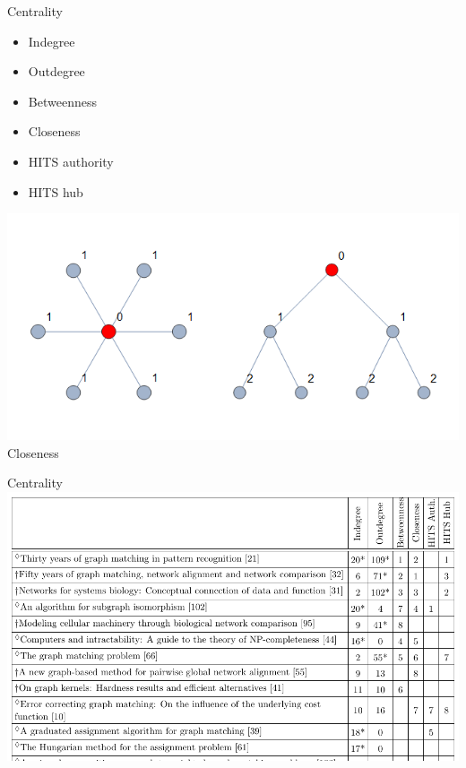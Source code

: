 \documentclass[xcolor=dvipsnames, 14pt]{beamer}
\begin{document}
\begin{frame}{Centrality}
\centering
\begin{minipage}{0.45\linewidth}
\begin{itemize}
\item Indegree
\item Outdegree
\item Betweenness
\item Closeness
\item HITS authority
\item HITS hub
\end{itemize}
\end{minipage}\hfill
\begin{minipage}{0.45\linewidth}
\centering
\includegraphics[width=\textwidth]{closeness_demo.png}
\scriptsize Closeness
\end{minipage}
\end{frame}

\begin{frame}{Centrality}
\includegraphics[width=\textwidth]{giant_table_ex.png}
\end{frame}
\end{document}
